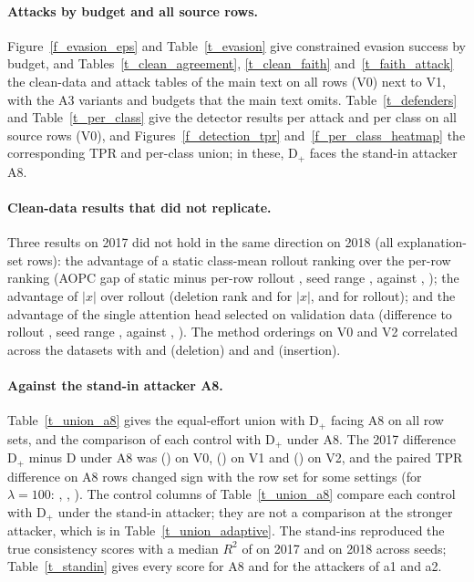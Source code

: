 \paragraph{Attacks by budget and all source rows.}
Figure~\ref{f_evasion_eps} and Table~\ref{t_evasion} give constrained evasion success by budget, and
Tables~\ref{t_clean_agreement}, \ref{t_clean_faith} and~\ref{t_faith_attack} the clean-data and attack tables of the
main text on all rows (V0) next to V1, with the A3 variants and budgets that the main text omits.
Table~\ref{t_defenders} and Table~\ref{t_per_class} give the detector results per attack and per class on all source
rows (V0), and Figures~\ref{f_detection_tpr} and~\ref{f_per_class_heatmap} the corresponding TPR and per-class union;
in these, D$_+$ faces the stand-in attacker A8.

\paragraph{Clean-data results that did not replicate.}
Three results on 2017 did not hold in the same direction on 2018 (all explanation-set rows): the advantage of a static
class-mean rollout ranking over the per-row ranking (AOPC gap of static minus per-row rollout \staticGapSeventeen{},
seed range \staticGapSeventeenRange, against \staticGapEighteen, \staticGapEighteenRange); the advantage of $|x|$ over
rollout (deletion rank \rankDelAbsXSeventeen{} and \rankDelAbsXEighteen{} for $|x|$, \rankDelRolloutSeventeen{} and
\rankDelRolloutEighteen{} for rollout); and the advantage of the single attention head selected on validation data
(difference to rollout \headMinusRolloutSeventeen, seed range \headMinusRolloutSeventeenRange, against
\headMinusRolloutEighteen, \headMinusRolloutEighteenRange).
The method orderings on V0 and V2 correlated across the datasets with \ordSpDelVzero{} and \ordSpDelVtwo{} (deletion)
and \ordSpInsVzero{} and \ordSpInsVtwo{} (insertion).

\paragraph{Against the stand-in attacker A8.}
Table~\ref{t_union_a8} gives the equal-effort union with D$_+$ facing A8 on all row sets, and the comparison of each
control with D$_+$ under A8.
The 2017 difference D$_+$ minus D under A8 was \axStandinVzeroSeventeen{} (\axStandinVzeroSeventeenCI) on V0,
\axStandinVoneSeventeen{} (\axStandinVoneSeventeenCI) on V1 and \axStandinVtwoSeventeen{} (\axStandinVtwoSeventeenCI) on
V2, and the paired TPR difference on A8 rows changed sign with the row set for some settings (for $\lambda = 100$:
\tprAeightHundredVzeroSeventeen, \tprAeightHundredVoneSeventeen, \tprAeightHundredVtwoSeventeen).
The control columns of Table~\ref{t_union_a8} compare each control with D$_+$ under the stand-in attacker; they are
not a comparison at the stronger attacker, which is in Table~\ref{t_union_adaptive}.
The stand-ins reproduced the true consistency scores with a median $R^2$ of \standinMedSeventeenRange{} on 2017 and
\standinMedEighteenRange{} on 2018 across seeds; Table~\ref{t_standin} gives every score for A8 and for the attackers
of a1 and a2.

